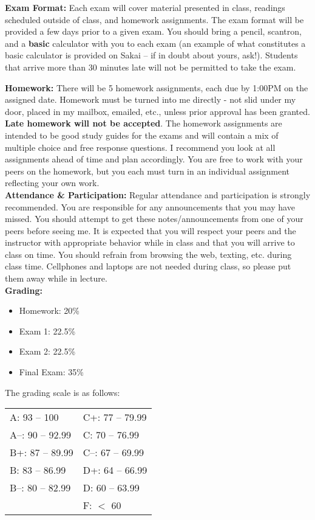 \documentclass[11pt]{article}
\begin{document}
\textbf{Exam Format:} Each exam will cover material presented in class, readings scheduled outside of class, and homework assignments. The exam format will be provided a few days prior to a given exam. You should bring a pencil, scantron, and a \textbf{basic} calculator with you to each exam (an example of what constitutes a basic calculator is provided on Sakai -- if in doubt about yours, ask!). Students that arrive more than 30 minutes late will not be permitted to take the exam. 

\newpage
\textbf{Homework:} There will be 5 homework assignments, each due by 1:00PM on the assigned date. Homework must be turned into me directly - not slid under my door, placed in my mailbox, emailed, etc., unless prior approval has been granted. \textbf{Late homework will not be accepted}. The homework assignments are intended to be good study guides for the exams and will contain a mix of multiple choice and free response questions. I recommend you look at all assignments ahead of time and plan accordingly. You are free to work with your peers on the homework, but you each must turn in an individual assignment reflecting your own work. \\

\textbf{Attendance \& Participation:} Regular attendance and participation is strongly recommended. You are responsible for any announcements that you may have missed. You should attempt to get these notes/announcements from one of your peers before seeing me. It is expected that you will respect your peers and the instructor with appropriate behavior while in class and that you will arrive to class on time. You should refrain from browsing the web, texting, etc. during class time. Cellphones and laptops are not needed during class, so please put them away while in lecture.  \\

\textbf{Grading:}
\begin{itemize}
\item Homework: 20\%
\item Exam 1: 	22.5\%
\item Exam 2: 22.5\%
\item	Final Exam: 35\% 
\end{itemize}

The grading scale is as follows:
\begin{center}
\begin{tabular}{ p{3.5cm} p{3.5cm} }
A: 93 -- 100 &  C+: 77 -- 79.99\\
A--: 90 -- 92.99 & C: 70 -- 76.99\\
B+: 87 -- 89.99 & C--: 67 -- 69.99\\
B: 83 -- 86.99 & D+: 64 -- 66.99\\
B--: 80 -- 82.99 & D: 60 -- 63.99\\
 & F: $<$ 60
 

\end{tabular}
\end{center}
\end{document}
